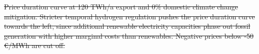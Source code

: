 \documentclass[5p,numafflabel]{elsarticle}
\newcommand{\co}{\ce{CO2}~}
\def\co{CO${}_2${\:}}
\providecommand{\DIFdeltex}[1]{{\protect\color{red}\sout{#1}}}                      %
\providecommand{\DIFdelend}{} %
\providecommand{\DIFdelFL}[1]{\DIFdel{#1}} %
\providecommand{\DIFdel}[1]{\texorpdfstring{\DIFdeltex{#1}}{}} %
\DeclareRobustCommand{\DIFdelend}{\DIFOaddend \let\includegraphics\DIFOincludegraphics} %
\begin{document}
{%
\DIFdelFL{Price duration curve at 120 TWh/a export and 0\% domestic climate change mitigation. Stricter temporal hydrogen regulation pushes the price duration curve towards the left, since additional renewable electricity capacities phase out fossil generation with higher marginal costs than renewables. Negative prices below -50 €/MWh are cut off.}}
\DIFdelend %
\end{document}
